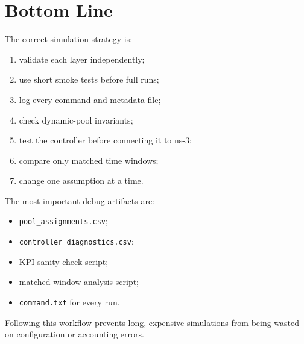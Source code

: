 \documentclass[11pt]{article}
\begin{document}
\section{Bottom Line}

The correct simulation strategy is:

\begin{enumerate}
    \item validate each layer independently;
    \item use short smoke tests before full runs;
    \item log every command and metadata file;
    \item check dynamic-pool invariants;
    \item test the controller before connecting it to ns-3;
    \item compare only matched time windows;
    \item change one assumption at a time.
\end{enumerate}

The most important debug artifacts are:

\begin{itemize}
    \item \texttt{pool\_assignments.csv};
    \item \texttt{controller\_diagnostics.csv};
    \item KPI sanity-check script;
    \item matched-window analysis script;
    \item \texttt{command.txt} for every run.
\end{itemize}

Following this workflow prevents long, expensive simulations from being wasted on configuration or accounting errors.
\end{document}
